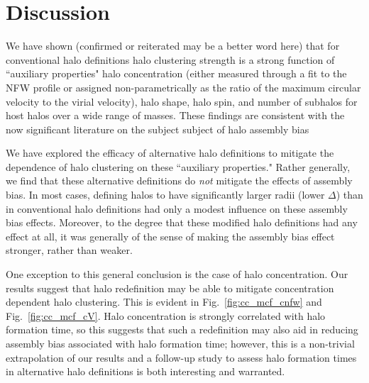 \documentclass[usenatbib,usegraphicx,letterpaper]{mn2e}
\begin{document}
\section{Discussion}
\label{section:discussion}


We have shown (confirmed or reiterated may be a better word here) that for conventional halo definitions 
halo clustering strength is a strong function of ``auxiliary properties" halo concentration (either measured through a fit to the 
NFW profile or assigned non-parametrically as the ratio of the maximum circular velocity to the virial 
velocity), halo shape, halo spin, and number of subhalos 
for host halos over a wide range of masses. These findings are consistent 
with the now significant literature on the subject subject of halo assembly bias 

We have explored the efficacy of alternative halo definitions to mitigate the dependence of halo 
clustering on these ``auxiliary properties." Rather generally, we find that these alternative definitions 
do {\em not} mitigate the effects of assembly bias. In most cases, defining halos to have significantly 
larger radii (lower $\Delta$) than in conventional halo definitions had only a modest influence on 
these assembly bias effects. Moreover, to the degree that these modified halo definitions had 
any effect at all, it was generally of the sense of 
making the assembly bias effect stronger, rather than weaker. 

One exception to this general conclusion is the case of halo concentration. 
Our results suggest that halo redefinition may be able to mitigate concentration 
dependent halo clustering. This is evident in Fig.~\ref{fig:cc_mcf_cnfw} and 
Fig.~\ref{fig:cc_mcf_cV}. Halo concentration is strongly correlated with halo formation 
time, so this suggests that such a redefinition may also aid in reducing assembly bias 
associated with halo formation time; however, this is a non-trivial extrapolation of our 
results and a follow-up study to assess halo formation times in alternative halo definitions 
is both interesting and warranted. 
\end{document}
